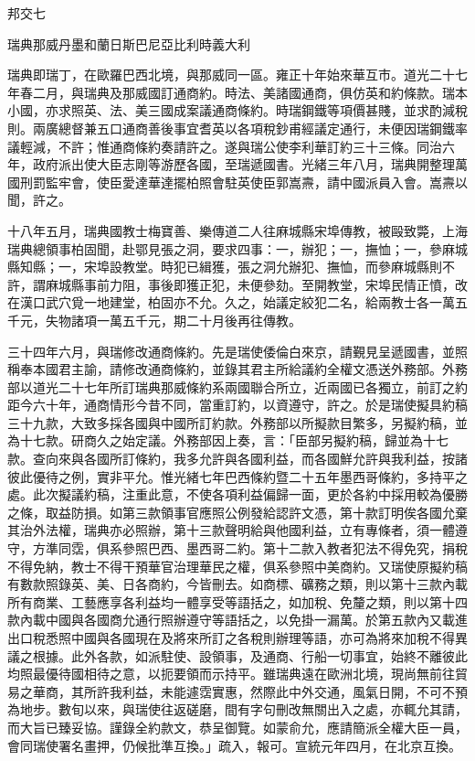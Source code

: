 
\begin{pinyinscope}
邦交七

瑞典那威丹墨和蘭日斯巴尼亞比利時義大利

瑞典即瑞丁，在歐羅巴西北境，與那威同一區。雍正十年始來華互市。道光二十七年春二月，與瑞典及那威國訂通商約。時法、美諸國通商，俱仿英和約條款。瑞本小國，亦求照英、法、美三國成案議通商條約。時瑞鋼鐵等項價甚賤，並求酌減稅則。兩廣總督兼五口通商善後事宜耆英以各項稅鈔甫經議定通行，未便因瑞鋼鐵率議輕減，不許；惟通商條約奏請許之。遂與瑞公使李利華訂約三十三條。同治六年，政府派出使大臣志剛等游歷各國，至瑞遞國書。光緒三年八月，瑞典開整理萬國刑罰監牢會，使臣愛達華達擺柏照會駐英使臣郭嵩燾，請中國派員入會。嵩燾以聞，許之。

十八年五月，瑞典國教士梅寶善、樂傳道二人往麻城縣宋埠傳教，被毆致斃，上海瑞典總領事柏固聞，赴鄂見張之洞，要求四事：一，辦犯；一，撫恤；一，參麻城縣知縣；一，宋埠設教堂。時犯已緝獲，張之洞允辦犯、撫恤，而參麻城縣則不許，謂麻城縣事前力阻，事後即獲正犯，未便參劾。至開教堂，宋埠民情正憤，改在漢口武穴覓一地建堂，柏固亦不允。久之，始議定絞犯二名，給兩教士各一萬五千元，失物諸項一萬五千元，期二十月後再往傳教。

三十四年六月，與瑞修改通商條約。先是瑞使倭倫白來京，請覲見呈遞國書，並照稱奉本國君主諭，請修改通商條約，並錄其君主所給議約全權文憑送外務部。外務部以道光二十七年所訂瑞典那威條約系兩國聯合所立，近兩國已各獨立，前訂之約距今六十年，通商情形今昔不同，當重訂約，以資遵守，許之。於是瑞使擬具約稿三十九款，大致多採各國與中國所訂約款。外務部以所擬款目繁多，另擬約稿，並為十七款。研商久之始定議。外務部因上奏，言：「臣部另擬約稿，歸並為十七款。查向來與各國所訂條約，我多允許與各國利益，而各國鮮允許與我利益，按諸彼此優待之例，實非平允。惟光緒七年巴西條約暨二十五年墨西哥條約，多持平之處。此次擬議約稿，注重此意，不使各項利益偏歸一面，更於各約中採用較為優勝之條，取益防損。如第三款領事官應照公例發給認許文憑，第十款訂明俟各國允棄其治外法權，瑞典亦必照辦，第十三款聲明給與他國利益，立有專條者，須一體遵守，方準同霑，俱系參照巴西、墨西哥二約。第十二款入教者犯法不得免究，捐稅不得免納，教士不得干預華官治理華民之權，俱系參照中美商約。又瑞使原擬約稿有數款照錄英、美、日各商約，今皆刪去。如商標、礦務之類，則以第十三款內載所有商業、工藝應享各利益均一體享受等語括之，如加稅、免釐之類，則以第十四款內載中國與各國商允通行照辦遵守等語括之，以免掛一漏萬。於第五款內又載進出口稅悉照中國與各國現在及將來所訂之各稅則辦理等語，亦可為將來加稅不得異議之根據。此外各款，如派駐使、設領事，及通商、行船一切事宜，始終不離彼此均照最優待國相待之意，以扼要領而示持平。雖瑞典遠在歐洲北境，現尚無前往貿易之華商，其所許我利益，未能遽霑實惠，然際此中外交通，風氣日開，不可不預為地步。數旬以來，與瑞使往返磋磨，間有字句刪改無關出入之處，亦輒允其請，而大旨已臻妥協。謹錄全約款文，恭呈御覽。如蒙俞允，應請簡派全權大臣一員，會同瑞使署名畫押，仍候批準互換。」疏入，報可。宣統元年四月，在北京互換。


\end{pinyinscope}
